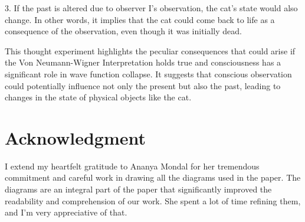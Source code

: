\documentclass{article}
\begin{document}
3. If the past is altered due to observer I's observation, the cat's state would also change. In other words, it implies that the cat could come back to life as a consequence of the observation, even though it was initially dead.

This thought experiment highlights the peculiar consequences that could arise if the Von Neumann-Wigner Interpretation holds true and consciousness has a significant role in wave function collapse. It suggests that conscious observation could potentially influence not only the present but also the past, leading to changes in the state of physical objects like the cat.




\section{\Large Acknowledgment}
I extend my heartfelt gratitude to Ananya Mondal for her tremendous commitment and careful work in drawing all the diagrams used in the paper. The diagrams are an integral part of the paper that significantly improved the readability and comprehension of our work. She spent a lot of time refining them, and I'm very appreciative of that.





\end{document}
